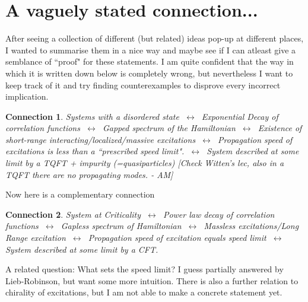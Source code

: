 \documentclass{article}
\newcommand\AM[1]{{\it \color{darkblue}  [#1 - AM]}}
\newtheorem{conn}{Connection}
\begin{document}
\section{A vaguely stated connection...}
After seeing a collection of different (but related) ideas pop-up at different places, I wanted to summarise them in a nice way and maybe see if I can atleast give a semblance of ``proof" for these statements. I am quite confident that the way in which it is written down below is completely wrong, but nevertheless I want to keep track of it and try finding counterexamples to disprove every incorrect implication.

\begin{conn}
    Systems with a disordered state $~\longleftrightarrow~$ Exponential Decay of correlation functions 
    $~\longleftrightarrow~$ Gapped spectrum of the Hamiltonian
    $~\longleftrightarrow~$ Existence of short-range interacting/localized/massive excitations
    $~\longleftrightarrow~$ Propagation speed of excitations is less than a ``prescribed speed limit".
    $~\longleftrightarrow~$ System described at some limit by a TQFT + impurity (=quasiparticles) \AM{Check Witten's lec, also in a TQFT there are no propagating modes.}
\end{conn}

Now here is a complementary connection
\begin{conn}
    System at Criticality 
    $~\longleftrightarrow~$ Power law decay of correlation functions
    $~\longleftrightarrow~$ Gapless spectrum of Hamiltonian
    $~\longleftrightarrow~$ Massless excitations/Long Range excitation
    $~\longleftrightarrow~$ Propagation speed of excitation equals speed limit
    $~\longleftrightarrow~$ System described at some limit by a CFT.
\end{conn}
A related question: What sets the speed limit? I guess partially answered by Lieb-Robinson, but want some more intuition. There is also a further relation to chirality of excitations, but I am not able to make a concrete statement yet.


\end{document}
